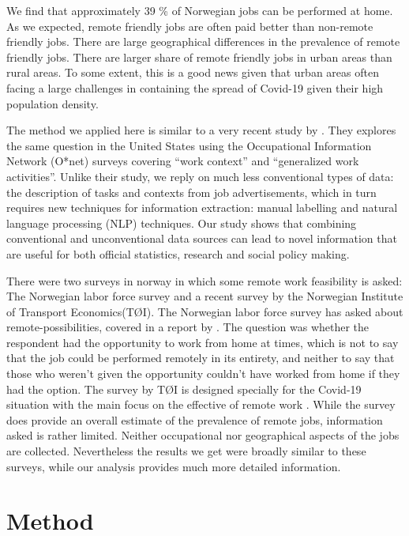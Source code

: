 \documentclass[11pt,]{article}
\begin{document}
We find that approximately 39 \% of Norwegian jobs can be performed at
home. As we expected, remote friendly jobs are often paid better than
non-remote friendly jobs. There are large geographical differences in
the prevalence of remote friendly jobs. There are larger share of remote
friendly jobs in urban areas than rural areas. To some extent, this is a
good news given that urban areas often facing a large challenges in
containing the spread of Covid-19 given their high population density.

The method we applied here is similar to a very recent study by
\citep{Dingel2020}. They explores the same question in the United States
using the Occupational Information Network (O*net) surveys covering
``work context'' and ``generalized work activities''. Unlike their
study, we reply on much less conventional types of data: the description
of tasks and contexts from job advertisements, which in turn requires
new techniques for information extraction: manual labelling and natural
language processing (NLP) techniques. Our study shows that combining
conventional and unconventional data sources can lead to novel
information that are useful for both official statistics, research and
social policy making.

There were two surveys in norway in which some remote work feasibility
is asked: The Norwegian labor force survey and a recent survey by the
Norwegian Institute of Transport Economics(TØI). The Norwegian labor
force survey has asked about remote-possibilities, covered in a report
by \citep{Nergaard2018}. The question was whether the respondent had the
opportunity to work from home at times, which is not to say that the job
could be performed remotely in its entirety, and neither to say that
those who weren't given the opportunity couldn't have worked from home
if they had the option. The survey by TØI is designed specially for the
Covid-19 situation with the main focus on the effective of remote work
\citep{Nordbakke2020}. While the survey does provide an overall estimate
of the prevalence of remote jobs, information asked is rather limited.
Neither occupational nor geographical aspects of the jobs are collected.
Nevertheless the results we get were broadly similar to these surveys,
while our analysis provides much more detailed information.

\hypertarget{method}{%
\section{Method}\label{method}}
\end{document}
